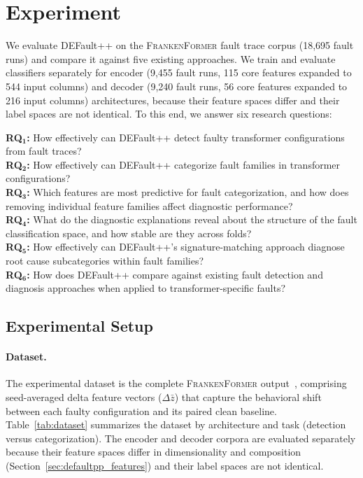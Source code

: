 \section{Experiment}
\label{sec:defaultpp_experiment}

We evaluate DEFault++ on the \textsc{FrankenFormer} fault trace corpus (18{,}695 fault runs) and compare it against five existing approaches. We train and evaluate classifiers separately for encoder (9{,}455 fault runs, 115 core features expanded to 544 input columns) and decoder (9{,}240 fault runs, 56 core features expanded to 216 input columns) architectures, because their feature spaces differ and their label spaces are not identical. To this end, we answer six research questions:

\smallskip\noindent
\textbf{RQ$\mathbf{_1}$:} How effectively can DEFault++ detect faulty transformer configurations from fault traces?\\
\textbf{RQ$\mathbf{_2}$:} How effectively can DEFault++ categorize fault families in transformer configurations?\\
\textbf{RQ$\mathbf{_3}$:} Which features are most predictive for fault categorization, and how does removing individual feature families affect diagnostic performance?\\
\textbf{RQ$\mathbf{_4}$:} What do the diagnostic explanations reveal about the structure of the fault classification space, and how stable are they across folds?\\
\textbf{RQ$\mathbf{_5}$:} How effectively can DEFault++'s signature-matching approach diagnose root cause subcategories within fault families?\\
\textbf{RQ$\mathbf{_6}$:} How does DEFault++ compare against existing fault detection and diagnosis approaches when applied to transformer-specific faults?

\bigskip

\subsection{Experimental Setup}
\label{sec:defaultpp_setup}

\paragraph{Dataset.}
The experimental dataset is the complete \textsc{FrankenFormer} output~\cite{frankenformer}, comprising seed-averaged delta feature vectors ($\Delta\bar{z}$) that capture the behavioral shift between each faulty configuration and its paired clean baseline. Table~\ref{tab:dataset} summarizes the dataset by architecture and task (detection versus categorization). The encoder and decoder corpora are evaluated separately because their feature spaces differ in dimensionality and composition (Section~\ref{sec:defaultpp_features}) and their label spaces are not identical.

